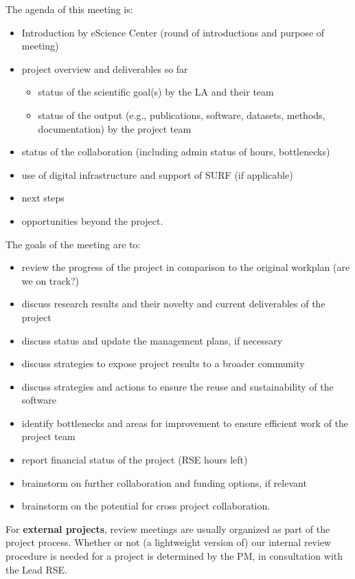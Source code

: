 \documentclass[11pt]{article}
\begin{document}
The agenda of this meeting is:

\begin{itemize}
\item Introduction by eScience Center (round of introductions and purpose of meeting)
\item project overview and deliverables so far
\begin{itemize}
\item status of the scientific goal(s) by the LA and their team
\item status of the output (e.g., publications, software, datasets, methods, documentation) by the project team
\end{itemize}
\item status of the collaboration (including admin status of hours, bottlenecks)
\item use of digital infrastructure and support of SURF (if applicable)
\item next steps
\item opportunities beyond the project.
\end{itemize}

The goals of the meeting are to:
\begin{itemize}
\item review the progress of the project in comparison to the original workplan (are we on track?)
\item discuss research results and their novelty and current deliverables of the project
\item discuss status and update the management plans, if necessary
\item discuss strategies to expose project results to a broader community
\item discuss strategies and actions to ensure the reuse and sustainability of the software
\item identify bottlenecks and areas for improvement to ensure efficient work of the project team
\item report financial status of the project (RSE hours left)
\item brainstorm on further collaboration and funding options, if relevant
\item brainstorm on the potential for cross project collaboration.
\end{itemize}

For \textbf{external projects}, review meetings are usually organized as part of the project process. Whether or not (a
lightweight version of) our internal review procedure is needed for a project is determined by the PM, in consultation
with the Lead RSE.
\end{document}
